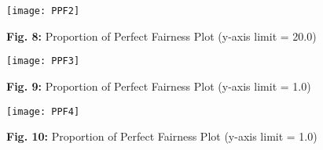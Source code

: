 \documentclass[a4paper, 12pt]{article}
\begin{document}
\texttt{[image: PPF2]}
\begin{center}

\normalsize{\textbf{Fig. 8:} Proportion of Perfect Fairness Plot (y-axis limit = 20.0)}
\end{center}



\texttt{[image: PPF3]}
\begin{center}

\normalsize{\textbf{Fig. 9:} Proportion of Perfect Fairness Plot (y-axis limit = 1.0)}
\end{center}


\texttt{[image: PPF4]}
\begin{center}

\normalsize{\textbf{Fig. 10:} Proportion of Perfect Fairness Plot (y-axis limit = 1.0)}
\end{center}
\end{document}
